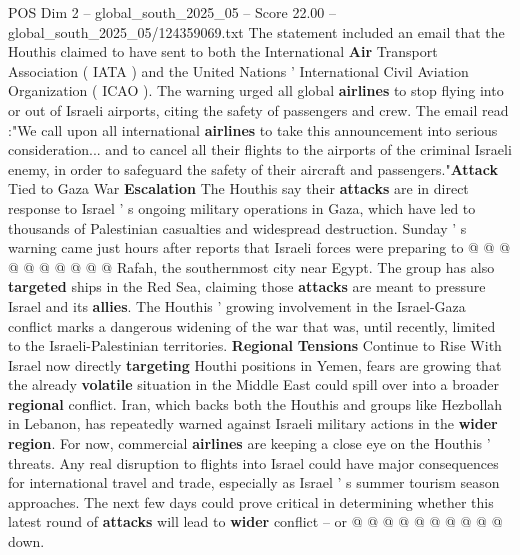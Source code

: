 \begin{textsample}{POS Dim 2 – global\_south\_2025\_05 – Score 22.00 – global\_south\_2025\_05/124359069.txt}
The statement included an email that the Houthis claimed to have sent to both the International \textbf{Air} Transport Association ( IATA ) and the United Nations ' International Civil Aviation Organization ( ICAO ).
The warning urged all global \textbf{airlines} to stop flying into or out of Israeli airports, citing the safety of passengers and crew.
The email read :"We call upon all international \textbf{airlines} to take this announcement into serious consideration... and to cancel all their flights to the airports of the criminal Israeli enemy, in order to safeguard the safety of their aircraft and passengers."\textbf{Attack} Tied to Gaza War \textbf{Escalation} The Houthis say their \textbf{attacks} are in direct response to Israel ' s ongoing military operations in Gaza, which have led to thousands of Palestinian casualties and widespread destruction.
Sunday ' s warning came just hours after reports that Israeli forces were preparing to @ @ @ @ @ @ @ @ @ @ Rafah, the southernmost city near Egypt.
The group has also \textbf{targeted} ships in the Red Sea, claiming those \textbf{attacks} are meant to pressure Israel and its \textbf{allies}.
The Houthis ' growing involvement in the Israel-Gaza conflict marks a dangerous widening of the war that was, until recently, limited to the Israeli-Palestinian territories. \textbf{Regional} \textbf{Tensions} Continue to Rise With Israel now directly \textbf{targeting} Houthi positions in Yemen, fears are growing that the already \textbf{volatile} situation in the Middle East could spill over into a broader \textbf{regional} conflict.
Iran, which backs both the Houthis and groups like Hezbollah in Lebanon, has repeatedly warned against Israeli military actions in the \textbf{wider} \textbf{region}.
For now, commercial \textbf{airlines} are keeping a close eye on the Houthis ' threats.
Any real disruption to flights into Israel could have major consequences for international travel and trade, especially as Israel ' s summer tourism season approaches.
The next few days could prove critical in determining whether this latest round of \textbf{attacks} will lead to \textbf{wider} conflict -- or @ @ @ @ @ @ @ @ @ @ down.

\end{textsample}

